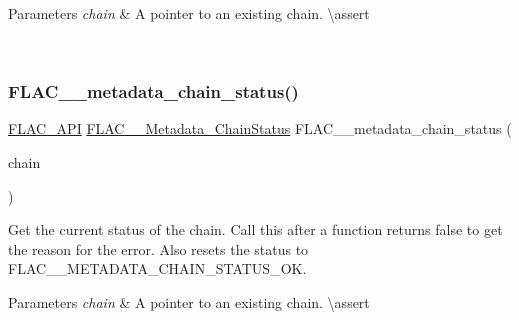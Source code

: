 \begin{DoxyParams}{Parameters}
{\em chain} & A pointer to an existing chain. \textbackslash{}assert 
\begin{DoxyCode}{1}
\end{DoxyCode}
 \\
\hline
\end{DoxyParams}
\mbox{\label{group__flac__metadata__level2_ga3d030e216a6517f23372bb76f0639127}} 
\subsubsection{\texorpdfstring{FLAC\_\_metadata\_chain\_status()}{FLAC\_\_metadata\_chain\_status()}}
{\footnotesize\ttfamily \mbox{\hyperlink{group__flac__export_ga56ca07df8a23310707732b1c0007d6f5}{F\+L\+A\+C\+\_\+\+A\+PI}} \mbox{\hyperlink{group__flac__metadata__level2_gafe2a924893b0800b020bea8160fd4531}{F\+L\+A\+C\+\_\+\+\_\+\+Metadata\+\_\+\+Chain\+Status}} F\+L\+A\+C\+\_\+\+\_\+metadata\+\_\+chain\+\_\+status (\begin{DoxyParamCaption}\item[{\mbox{\hyperlink{group__flac__metadata__level2_gaec6993c60b88f222a52af86f8f47bfdf}{F\+L\+A\+C\+\_\+\+\_\+\+Metadata\+\_\+\+Chain}} $\ast$}]{chain }\end{DoxyParamCaption})}

Get the current status of the chain. Call this after a function returns {\ttfamily false} to get the reason for the error. Also resets the status to F\+L\+A\+C\+\_\+\+\_\+\+M\+E\+T\+A\+D\+A\+T\+A\+\_\+\+C\+H\+A\+I\+N\+\_\+\+S\+T\+A\+T\+U\+S\+\_\+\+OK.


\begin{DoxyParams}{Parameters}
{\em chain} & A pointer to an existing chain. \textbackslash{}assert 
\begin{DoxyCode}{1}
\end{DoxyCode}
 \\
\hline
\end{DoxyParams}

